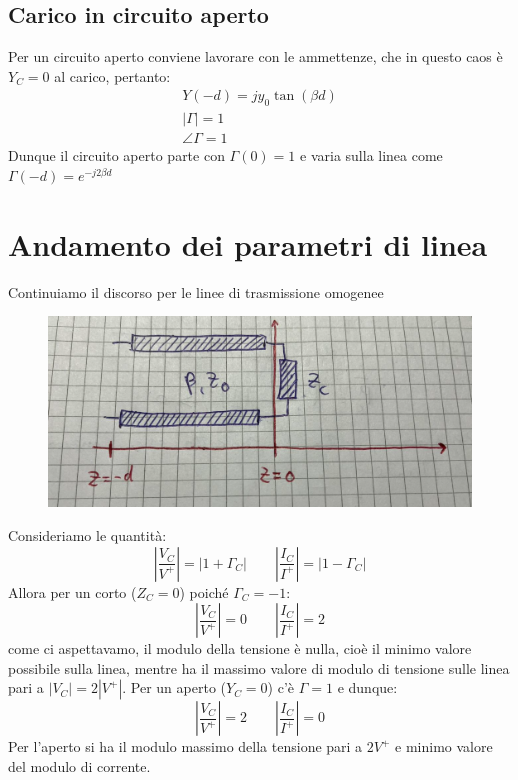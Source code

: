 \documentclass{book}
\begin{document}
    \subsection*{Carico in circuito aperto}
        Per un circuito aperto conviene lavorare con le ammettenze, 
        che in questo caos è $Y_{C}=0$ al carico, pertanto:
        \begin{align}
            Y(-d) = j y_{0}\tan(\beta d) \\
            |\Gamma| = 1 \\
            \angle \Gamma = 1
        \end{align}
        Dunque il circuito aperto parte con $\Gamma(0)=1$ e varia sulla linea come $\Gamma(-d)=e^{-j2 \beta d}$
    \newpage 
    \section{Andamento dei parametri di linea}
    Continuiamo il discorso per le linee di trasmissione omogenee
    \begin{figure}[h!]
        \center  
        \includegraphics[width=0.6\linewidth]{Chapter_two/Chapt2img11.png}
    \end{figure}
    Consideriamo le quantità:
    \begin{equation}
        |\frac{V_{C}}{V^{+}}| = |1+\Gamma_{C}| \qquad |\frac{I_{C}}{I^{+}}| = |1-\Gamma_{C}|
    \end{equation}
    Allora per un corto ($Z_{C}=0$) poiché $\Gamma_{C}=-1$:
    \begin{equation}
        |\frac{V_{C}}{V^{+}}| = 0 \qquad |\frac{I_{C}}{I^{+}}|=2
    \end{equation}
    come ci aspettavamo, il modulo della tensione è nulla, cioè il minimo valore possibile sulla linea, 
    mentre ha il massimo valore di modulo di tensione sulle linea pari a $|V_{C}|=2|V^{+}|$. Per un aperto 
    ($Y_{C}=0$) c'è $\Gamma = 1$ e dunque:
    \begin{equation}
        |\frac{V_{C}}{V^{+}}|=2 \qquad |\frac{I_{C}}{I^{+}}|=0
    \end{equation}
    Per l'aperto si ha il modulo massimo della tensione pari a $2V^{+}$ e minimo valore del modulo di corrente. 
\end{document}
